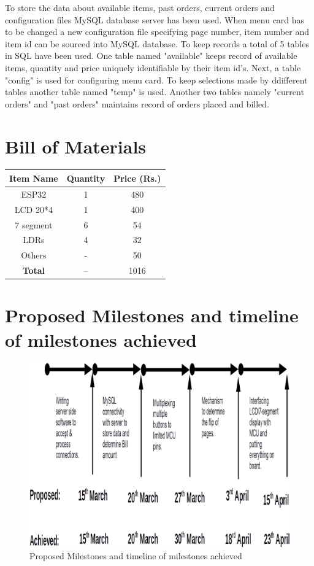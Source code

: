 \documentclass[12pt,a4paper]{article}
\begin{document}
		\begin{info}
		To store the data about available items, past orders, current orders and configuration files MySQL database server has been used. When menu card has to be changed a new configuration file specifying page number, item number and item id can be sourced into MySQL database. To keep records a total of 5 tables in SQL have been used. One table named "available" keeps record of available items, quantity and price uniquely identifiable by their item id's. Next, a table "config" is used for configuring menu card. To keep selections made by ddifferent tables another table named "temp" is used. Another two tables namely "current orders" and "past orders" maintains record of orders placed and billed.
		\end{info}
	    \section{Bill of Materials}
	    \begin{center}
		    \begin{tabular}{|c|c|c|}
		    	\hline
		    	\textbf{Item Name} & \textbf{Quantity} & \textbf{Price (Rs.)} \\
		    	\hline
		    	ESP32 & 1 & 480\\
		    	\hline
		    	LCD 20*4 & 1 & 400\\
		    	\hline
		    	7 segment & 6 & 54\\
		    	\hline
		    	LDRs & 4 & 32\\
		    	\hline
		    	Others & - & 50\\
		    	\hline
		    	\textbf{Total} & -- & 1016\\
		    	\hline
			\end{tabular}

	    \end{center}
	    
	    \section{Proposed Milestones and timeline of milestones achieved}
   		\begin{figure}[h]
			\centering
			\caption{Proposed Milestones and timeline of milestones achieved}
			\includegraphics[scale=.45]{timeline}
		\end{figure}
\end{document}
